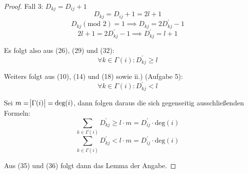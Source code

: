 \documentclass{article}
\begin{document}
\begin{proof}
\noindent
Fall 3: $D_{kj} = D_{ij} + 1$
\begin{equation}
  D_{kj} = D_{ij} + 1 = 2l + 1
\end{equation}
\begin{equation}
  D_{kj}(\text{mod } 2) = 1 \implies D_{kj} = 2D^{'}_{kj} - 1
\end{equation}
\begin{equation}
  2l + 1 = 2D^{'}_{kj} - 1 \implies D^{'}_{kj} = l + 1
\end{equation}

\noindent
Es folgt also aus (26), (29) und (32):
\begin{equation}
  \forall k \in \Gamma(i): D^{'}_{kj} \geq l
\end{equation}

\noindent
Weiters folgt aus (10), (14) und (18) sowie ii.) (Aufgabe 5):
\begin{equation}
  \forall k \in \Gamma(i): D^{'}_{kj} < l
\end{equation}

\noindent
Sei $m=\abs{\Gamma(i)} = \text{deg}(i)$, dann folgen daraus die sich gegenseitig ausschlie{\ss}enden Formeln:
\begin{equation}
  \sum_{k \in \Gamma(i)} D^{'}_{kj} \geq l \cdot m = D^{'}_{ij} \cdot \text{deg}(i)
\end{equation}
\begin{equation}
  \sum_{k \in \Gamma(i)} D^{'}_{kj} < l \cdot m = D^{'}_{ij} \cdot \text{deg}(i)
\end{equation}

\noindent
Aus (35) und (36) folgt dann das Lemma der Angabe.
\end{proof}
\end{document}
